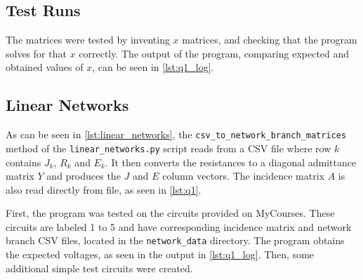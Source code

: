 \documentclass[a4paper,titlepage]{article}
\begin{document}
	\subsection{Test Runs}
	
	The matrices were tested by inventing $x$ matrices, and checking that the program solves for that $x$ correctly. The output of the program, comparing expected and obtained values of $x$, can be seen in \autoref{lst:q1_log}.
	
	\subsection{Linear Networks}
	
	As can be seen in \autoref{lst:linear_networks}, the \texttt{csv_to_network_branch_matrices} method of the \texttt{linear_networks.py} script reads from a CSV file where row $k$ contains $J_k$, $R_k$ and $E_k$. It then converts the resistances to a diagonal admittance matrix $Y$ and produces the $J$ and $E$ column vectors. The incidence matrix $A$ is also read directly from file, as seen in \autoref{lst:q1}.
	
	First, the program was tested on the circuits provided on MyCourses. These circuits are labeled 1 to 5 and have corresponding incidence matrix and network branch CSV files, located in the \texttt{network_data} directory. The program obtains the expected voltages, as seen in the output in \autoref{lst:q1_log}. Then, some additional simple test circuits were created.
	
\end{document}
